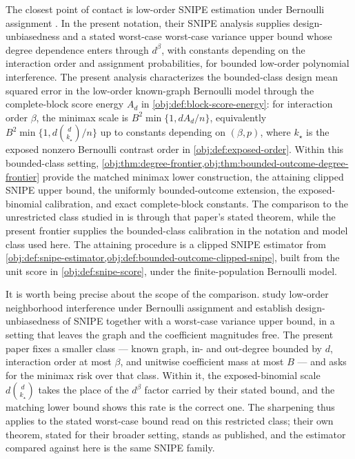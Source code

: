 The closest point of contact is low-order SNIPE estimation under Bernoulli assignment \citep{CortezRodriguezEichhornYu2023}. In the present notation, their SNIPE analysis supplies design-unbiasedness and a stated worst-case worst-case variance upper bound whose degree dependence enters through \(d^{\beta}\), with constants depending on the interaction order and assignment probabilities, for bounded low-order polynomial interference. The present analysis characterizes the bounded-class design mean squared error in the low-order known-graph Bernoulli model through the complete-block score energy \(A_d\) in \cref{obj:def:block-score-energy}: for interaction order \(\beta\), the minimax scale is \(B^2\min\{1,dA_d/n\}\), equivalently \(B^2\min\{1,d\binom d{k_\star}/n\}\) up to constants depending on \((\beta,p)\), where \(k_\star\) is the exposed nonzero Bernoulli contrast order in \cref{obj:def:exposed-order}. Within this bounded-class setting, \cref{obj:thm:degree-frontier,obj:thm:bounded-outcome-degree-frontier} provide the matched minimax lower construction, the attaining clipped SNIPE upper bound, the uniformly bounded-outcome extension, the exposed-binomial calibration, and exact complete-block constants. The comparison to the unrestricted class studied in \citet{CortezRodriguezEichhornYu2023} is through that paper's stated theorem, while the present frontier supplies the bounded-class calibration in the notation and model class used here. The attaining procedure is a clipped SNIPE estimator from \cref{obj:def:snipe-estimator,obj:def:bounded-outcome-clipped-snipe}, built from the unit score in \cref{obj:def:snipe-score}, under the finite-population Bernoulli model.

It is worth being precise about the scope of the comparison. \citet{CortezRodriguezEichhornYu2023} study low-order neighborhood interference under Bernoulli assignment and establish design-unbiasedness of SNIPE together with a worst-case variance upper bound, in a setting that leaves the graph and the coefficient magnitudes free. The present paper fixes a smaller class — known graph, in- and out-degree bounded by \(d\), interaction order at most \(\beta\), and unitwise coefficient mass at most \(B\) — and asks for the minimax risk over that class. Within it, the exposed-binomial scale \(d\binom d{k_\star}\) takes the place of the \(d^{\beta}\) factor carried by their stated bound, and the matching lower bound shows this rate is the correct one. The sharpening thus applies to the stated worst-case bound read on this restricted class; their own theorem, stated for their broader setting, stands as published, and the estimator compared against here is the same SNIPE family.

